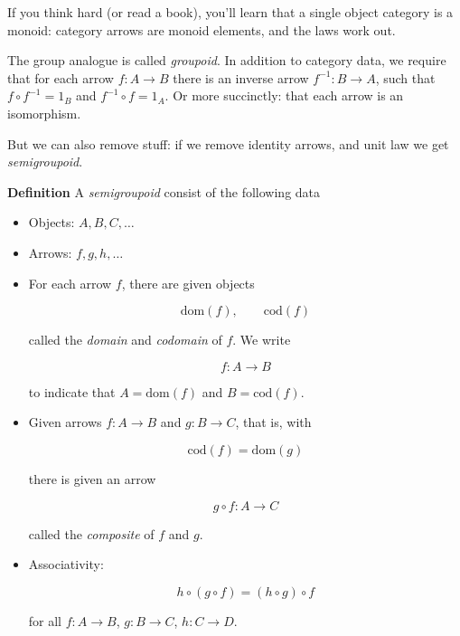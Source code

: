 \documentclass{article}
\begin{document}
If you think hard (or read a book), you'll learn that a single object
category is a monoid: category arrows are monoid elements, and the
laws work out.

The group analogue is called \emph{groupoid}. In addition to
category data, we require that for each arrow $f : A \to B$ there is an inverse arrow $f^{-1} : B \to A$,
such that $f \circ f^{-1} = 1_B$ and $f^{-1} \circ f = 1_A$.
Or more succinctly: that each arrow is an isomorphism.

But we can also remove stuff: if we remove identity arrows,
and unit law we get \emph{semigroupoid}.

\begin{definition}\textbf{Definition}
A \emph{semigroupoid} consist of the following data
\begin{itemize}
\item Objects: $A, B, C, \ldots$
\item Arrows: $f, g, h, \ldots$

\item For each arrow $f$, there are given objects

\begin{equation*}
\mathrm{dom}(f), \qquad \mathrm{cod}(f)
\end{equation*}

called the \emph{domain} and \emph{codomain} of $f$. We write

\begin{equation*}
f : A \to B
\end{equation*}

to indicate that $A = \mathrm{dom}(f)$ and $B = \mathrm{cod}(f)$.

\item Given arrows $f : A \to B$ and $g : B \to C$, that is, with

\begin{equation*}
\mathrm{cod}(f) = \mathrm{dom}(g)
\end{equation*}

there is given an arrow

\begin{equation*}
g \circ f : A \to C
\end{equation*}

called the \emph{composite} of $f$ and $g$.

\item Associativity:

\begin{equation*}
h \circ (g \circ f) = (h \circ g) \circ f
\end{equation*}

for all $f : A \to B$, $g : B \to C$, $h : C \to D$.

\end{itemize}
\end{definition}
\end{document}
